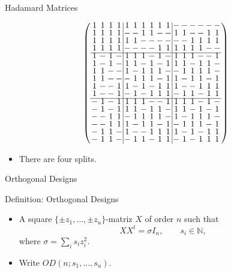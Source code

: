 \documentclass{beamer}
\begin{document}
\begin{frame}{Hadamard Matrices}

  \[
    \arraycolsep=1.0pt\def\arraystretch{0.75}
    \left(\begin{array}{cccc|cccccc|cccccc}
            1&1&1&1&1&1&1&1&1&1&-&-&-&-&-&-\\
            1&1&1&1&-&-&1&1&-&-&1&1&-&-&1&1\\
            1&1&1&1&1&1&-&-&-&-&-&-&1&1&1&1\\
            1&1&1&1&-&-&-&-&1&1&1&1&1&1&-&-\\ \hline
            1&-&1&-&1&1&1&-&1&-&1&1&1&-&-&1\\
            1&-&1&-&1&1&-&1&-&1&1&1&-&1&1&-\\
            1&1&-&-&1&-&1&1&1&-&-&1&1&1&1&-\\
            1&1&-&-&-&1&1&1&-&1&1&-&1&1&-&1\\
            1&-&-&1&1&-&1&-&1&1&1&-&-&1&1&1\\
            1&-&-&1&-&1&-&1&1&1&-&1&1&-&1&1\\ \hline
            -&1&-&1&1&1&1&-&-&1&1&1&1&-&1&-\\
            -&1&-&1&1&1&-&1&1&-&1&1&-&1&-&1\\
            -&-&1&1&-&1&1&1&1&-&1&-&1&1&1&-\\
            -&-&1&1&1&-&1&1&-&1&-&1&1&1&-&1\\
            -&1&1&-&1&-&-&1&1&1&1&-&1&-&1&1\\
            -&1&1&-&-&1&1&-&1&1&-&1&-&1&1&1\\
          \end{array}\right)
  \]

  \begin{itemize}
    \item There are four splits.
  \end{itemize}

\end{frame}


\begin{frame}{Orthogonal Designs}

  \begin{block}{Definition: Orthogonal Designs}
    \begin{itemize}
    \item A square $\{\pm z_1, \dots, \pm z_u\}$-matriz $X$ of order $n$ such
      that
      $$
      XX^t = \sigma I_n, \qquad s_i \in \mathbb{N},
      $$
      where $\sigma = \sum_i s_iz_i^2$.
      \item Write $OD(n;s_1, \dots, s_u)$.
    \end{itemize}
  \end{block}

\end{frame}
\end{document}
